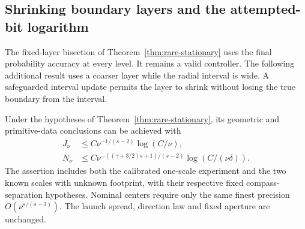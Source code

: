 \subsection{Shrinking boundary layers and the attempted-bit logarithm}
The fixed-layer bisection of Theorem~\ref{thm:rare-stationary} uses the
final probability accuracy at every level. It remains a valid controller.
The following additional result uses a coarser layer while the radial
interval is wide. A safeguarded interval update permits the layer to
shrink without losing the true boundary from the interval.

\begin{proposition}
\label{prop:shrinking-rare}
Under the hypotheses of Theorem~\ref{thm:rare-stationary}, its geometric
and primitive-data conclusions can be achieved with
\begin{align}
 J_\nu&\le C\nu^{-1/(s-2)}\log(C/\nu),
                                  \label{eq:shrinking-centers}\\
 N_\nu&\le C\nu^{-((\gamma+3/2)s+1)/(s-2)}
                                      \log(C/(\nu\delta)).
                                  \label{eq:shrinking-attempts}
\end{align}
The assertion includes both the calibrated one-scale experiment and
the two known scales with unknown footprint, with their respective
fixed compass-separation hypotheses. Nominal centers require only the
same finest precision $O(\nu^{s/(s-2)})$. The launch spread, direction
law and fixed aperture are unchanged.
\end{proposition}
